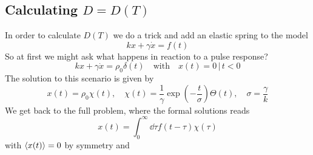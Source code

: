 \documentclass{/home/ben/Templates/notebook}
\begin{document}
	\subsection*{Calculating $D = D(T)$}
	
	In order to calculate $D(T)$ we do a trick and add an elastic spring to the model
	\begin{equation}
	k x + \gamma \dot{x} = f(t)
	\end{equation}
	So at first we might ask what happens in reaction to a pulse response?
	\begin{equation}
	k x + \gamma \dot{x} = \rho_0 \delta(t) \quad \mathrm{with} \quad x(t) = 0 \, | \, t < 0
	\end{equation}
	The solution to this scenario is given by
	\begin{equation}
	x(t) = \rho_0 \chi(t), \quad \chi(t) = \frac{1}{\gamma} \exp(-\frac{t}{\sigma}) \Theta(t), \quad \sigma = \frac{\gamma}{k}
	\end{equation}
	We get back to the full problem, where the formal solutions reads
	\begin{equation}
	x(t) =  \int_0^{\infty}{\dd{\tau} f(t - \tau) \chi(\tau)}
	\end{equation}
	with $\expval{x(t)} = 0$ by symmetry and 
	
\end{document}
